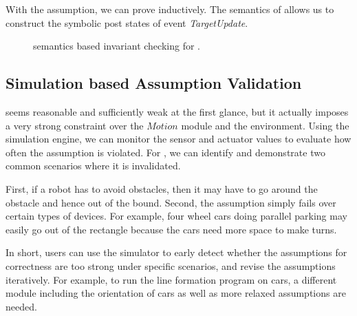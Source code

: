 With the assumption, we can prove  inductively.
The \K semantics of \lgname allows us to construct the symbolic post states of event \emph{TargetUpdate}.

\begin{figure}
\caption{\K semantics based invariant checking for \lgname.}
\end{figure}

\subsection{Simulation based Assumption Validation}

 seems reasonable and sufficiently weak at the first glance,
but it actually imposes a very strong constraint over the $Motion$ module and the environment.
Using the simulation engine, we can monitor the sensor and actuator values to evaluate how often the assumption is violated.
For , we can identify and demonstrate two common scenarios
where it is invalidated.

First, if a robot has to avoid obstacles,
then it may have to go around the obstacle and hence out of the bound.
Second, the assumption simply fails over certain types of devices.
For example, four wheel cars doing parallel parking may easily go out of the rectangle
because the cars need more space to make turns.

In short, users can use the simulator to early detect whether
the assumptions for correctness are too strong under specific scenarios,
and revise the assumptions iteratively.
For example, to run the line formation program on cars,
a different module including the orientation of cars as well as more relaxed assumptions are needed.

